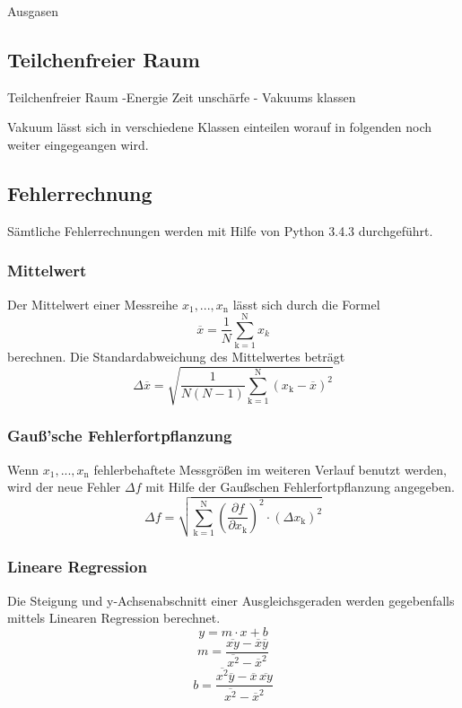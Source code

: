 Ausgasen


\subsection{Teilchenfreier Raum}

Teilchenfreier Raum
-Energie Zeit unschärfe
- Vakuums klassen 

Vakuum lässt sich in verschiedene Klassen einteilen worauf in folgenden noch weiter eingegeangen wird.

\subsection{Fehlerrechnung}
Sämtliche Fehlerrechnungen werden mit Hilfe von Python 3.4.3 durchgeführt.
\subsubsection{Mittelwert}
Der Mittelwert einer Messreihe $x_\text{1}, ... ,x_\text{n}$ lässt sich durch die Formel
\begin{equation}
	\overline{x} = \frac{1}{N} \sum_{\text{k}=1}^\text{N} x_k
	\label{eqn:ave}
\end{equation}
berechnen. Die Standardabweichung des Mittelwertes beträgt
\begin{equation}
	\Delta \overline{x} = \sqrt{ \frac{1}{N(N-1)} \sum_{\text{k}=1}^\text{N} (x_\text{k} - \overline{x})^2}
	\label{eqn:std}
\end{equation}

\subsubsection{Gauß'sche Fehlerfortpflanzung}
Wenn $x_\text{1}, ..., x_\text{n}$ fehlerbehaftete Messgrößen im weiteren Verlauf benutzt werden, wird der neue Fehler $\Delta f$ mit Hilfe der Gaußschen Fehlerfortpflanzung angegeben.
\begin{equation}
	\Delta f = \sqrt{\sum_{\text{k}=1}^\text{N} \left( \frac{ \partial f}{\partial x_\text{k}} \right) ^2 \cdot (\Delta x_\text{k})^2}
	\label{eqn:var}
\end{equation}

\subsubsection{Lineare Regression}
Die Steigung und y-Achsenabschnitt einer Ausgleichsgeraden werden gegebenfalls mittels Linearen Regression berechnet.
\begin{equation}
	y = m \cdot x + b
	\label{eqn:reg}
\end{equation}
\begin{equation}
	m = \frac{ \overline{xy} - \overline{x} \overline{y} } {\overline{x^2} - \overline{x}^2}
	\label{eqn:reg_m}
\end{equation}
\begin{equation}
	b = \frac{ \overline{x^2}\overline{y} - \overline{x} \, \overline{xy}} { \overline{x^2} - \overline{x}^2}
	\label{eqn:reg_b}
\end{equation}
